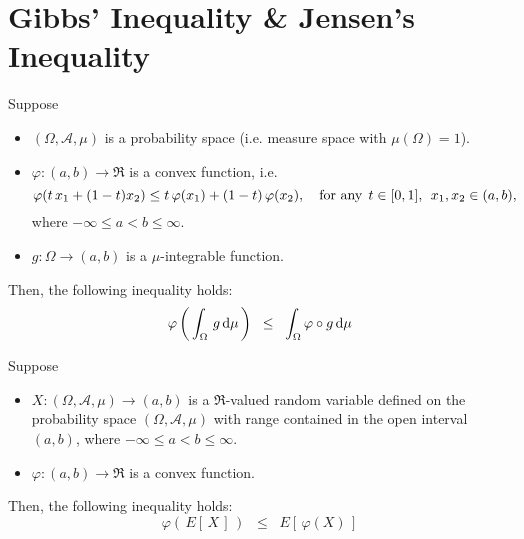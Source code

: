 \section{Gibbs' Inequality \& Jensen's Inequality}
\setcounter{theorem}{0}
\setcounter{equation}{0}

\begin{theorem}
\mbox{} \vskip 0.1cm
\noindent
Suppose
\begin{itemize}
\item  $(\Omega,\mathcal{A},\mu)$ is a probability space (i.e. measure space with $\mu(\Omega) = 1$).
\item  $\varphi : (a,b) \longrightarrow \Re$ is a convex function, i.e.
       \begin{equation*}
       \varphi(t\,x_{1}+(1-t)x_{2}) \leq t\,\varphi(x_{1}) + (1-t)\,\varphi(x_{2}),
       \quad
       \textnormal{for any}\;\, t \in [0,1],\;\, x_{1}, x_{2} \in (a,b),
       \end{equation*}
       where $-\infty \leq a < b \leq \infty$.
\item  $g : \Omega \longrightarrow (a,b)$ is a $\mu$-integrable function.
\end{itemize}
Then, the following inequality holds:
\begin{equation*}
\varphi\left(\,\int_{\Omega} \, g \, \textnormal{d}\mu\,\right)
\;\; \leq \;\;
\int_{\Omega}\varphi \circ g \, \textnormal{d}\mu
\end{equation*}
\end{theorem}

\begin{corollary}
\mbox{} \vskip 0.1cm
\noindent
Suppose
\begin{itemize}
\item  $X : (\Omega,\mathcal{A},\mu) \longrightarrow (a,b)$ is a $\Re$-valued random variable
       defined on the probability space $(\Omega,\mathcal{A},\mu)$ with range contained in the
       open interval $(a,b)$, where $-\infty \leq a < b \leq \infty$.
\item  $\varphi : (a,b) \longrightarrow \Re$ is a convex function.
\end{itemize}
Then, the following inequality holds:
\begin{equation*}
\varphi\left(\,E[\,X\,]\,\right) \;\; \leq \;\; E\!\left[\,\varphi(X)\,\right]
\end{equation*}
\end{corollary}

